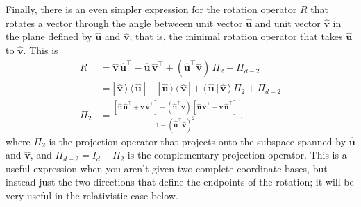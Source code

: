 \documentclass{article}
\newcommand{\proj}{\mathsf{\Pi}}
\newcommand{\Ehat}[1]{{\mathbf{\hat{#1}}}} %
\newcommand{\braket}[2]{\langle\,{#1}\,|\,{#2}\,\rangle}
\newcommand{\ketbra}[2]{|\,{#1}\,\rangle\,\langle\,{#2}\,|}
\begin{document}
Finally, there is an even simpler expression for the rotation operator $R$ that rotates a vector through the angle betweeen unit vector $\Ehat{u}$ and unit vector $\Ehat{v}$ in the plane defined by $\Ehat{u}$ and $\Ehat{v}$; that is, the minimal rotation operator that takes $\Ehat{u}$ to $\Ehat{v}$.
This is
\begin{align}
    R &= \Ehat{v}\,\Ehat{u}^\top - \Ehat{u}\,\Ehat{v}^\top + (\Ehat{u}^\top\Ehat{v})\,\proj_{2} + \proj_{d-2} \\
    &= \ketbra{\Ehat{v}}{\Ehat{u}} - \ketbra{\Ehat{u}}{\Ehat{v}} + \braket{\Ehat{u}}{\Ehat{v}}\,\proj_2 + \proj_{d-2} \\
    \proj_2 &= \frac{[\Ehat{u}\,\Ehat{u}^\top + \Ehat{v}\,\Ehat{v}^\top] - (\Ehat{u}^\top\Ehat{v})\,[\Ehat{u}\,\Ehat{v}^\top + \Ehat{v}\,\Ehat{u}^\top]}{1 - (\Ehat{u}^\top\Ehat{v})^2} ~,
\end{align}
where $\proj_2$ is the projection operator that projects onto the subspace spanned by $\Ehat{u}$ and $\Ehat{v}$, and $\proj_{d-2} = I_d - \proj_2$ is the complementary projection operator.
This is a useful expression when you aren't given two complete coordinate bases, but instead just the two directions that define the endpoints of the rotation; it will be very useful in the relativistic case below.
\end{document}
